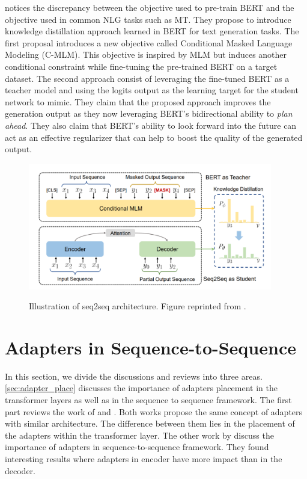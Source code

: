 \cite{chen2019distilling} notices the discrepancy between the objective used to pre-train BERT and the objective used in common NLG tasks such as MT. They propose to introduce knowledge distillation approach learned in BERT for text generation tasks. The first proposal introduces a new objective called Conditional Masked Language Modeling (C-MLM). This objective is inspired by MLM but induces another conditional constraint while fine-tuning the pre-trained BERT on a target dataset. The second approach consist of leveraging the fine-tuned BERT as a teacher model and using the logits output as the learning target for the student network to mimic. They claim that the proposed approach improves the generation output as they now leveraging BERT's bidirectional ability to \textit{plan ahead}. They also claim that BERT's ability to look forward into the future can act as an effective regularizer that can help to boost the quality of the generated output.

\begin{figure}[h]
    {\includegraphics[width=0.95\textwidth]{img/bert_distill.png}}
    \centering
    \caption{Illustration of seq2seq architecture. Figure reprinted from \cite{chen2019distilling}.}
    \label{img:bert_distill}
\end{figure}

\section{Adapters in Sequence-to-Sequence}
\label{sec:adapter_seq}

In this section, we divide the discussions and reviews into three areas. \cref{sec:adapter_place} discusses the importance of adapters placement in the transformer layers as well as in the sequence to sequence framework. The first part reviews the work of \cite{houlsby2019parameter} and \cite{bapna2019simple}. Both works propose the same concept of adapters with similar architecture. The difference between them lies in the placement of the adapters within the transformer layer. The other work by \cite{winata2020adapt} discuss the importance of adapters in sequence-to-sequence framework. They found interesting results where adapters in encoder have more impact than in the decoder.

